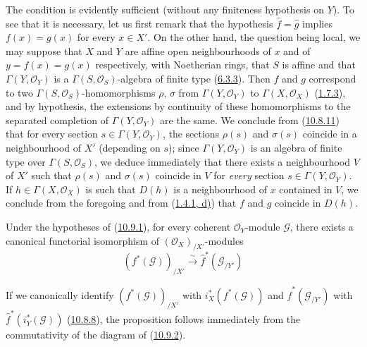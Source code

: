 The condition is evidently sufficient (without any finiteness hypothesis
on $Y$). To see that it is necessary, let us first remark that the
hypothesis $\widehat f=\widehat g$ implies $f(x)=g(x)$ for every
$x\in X'$. On the other hand, the question being local, we may suppose
that $X$ and $Y$ are affine open neighbourhoods of $x$ and of
$y=f(x)=g(x)$ respectively, with Noetherian rings, that $S$ is affine and
that $\Gamma(Y,\mathscr{O}_Y)$ is a $\Gamma(S,\mathscr{O}_S)$-algebra of
finite type (\hyperref[I.6.3.3]{6.3.3}). Then $f$ and $g$ correspond
to two $\Gamma(S,\mathscr{O}_S)$-homomorphisms $\rho$, $\sigma$ from
$\Gamma(Y,\mathscr{O}_Y)$ to $\Gamma(X,\mathscr{O}_X)$
(\hyperref[I.1.7.3]{1.7.3}), and by hypothesis, the extensions by
continuity of these homomorphisms to the separated completion of
$\Gamma(Y,\mathscr{O}_Y)$ are the same. We conclude from
(\hyperref[I.10.8.11]{10.8.11}) that for every section
$s\in\Gamma(Y,\mathscr{O}_Y)$, the sections $\rho(s)$ and $\sigma(s)$
coincide in a neighbourhood of $X'$ (depending on $s$); since
$\Gamma(Y,\mathscr{O}_Y)$ is an algebra of finite type over
$\Gamma(S,\mathscr{O}_S)$, we deduce immediately that there exists a
neighbourhood $V$ of $X'$ such that $\rho(s)$ and $\sigma(s)$ coincide in
$V$ for \emph{every} section $s\in\Gamma(Y,\mathscr{O}_Y)$. If
$h\in\Gamma(X,\mathscr{O}_X)$ is such that $D(h)$ is a neighbourhood of
$x$ contained in $V$, we conclude from the foregoing and from
(\hyperref[I.1.4.1]{1.4.1, d)}) that $f$ and $g$ coincide in $D(h)$.

\begin{proposition}[10.9.5]
\label{I.10.9.5}
Under the hypotheses of (\hyperref[I.10.9.1]{10.9.1}), for every
coherent $\mathscr{O}_Y$-module $\mathscr{G}$, there exists a canonical
functorial isomorphism of $(\mathscr{O}_X)_{/X'}$-modules
\[
  (f^*(\mathscr{G}))_{/X'}\xrightarrow{\sim}
  \widehat f^*(\mathscr{G}_{/Y'})
\]
\end{proposition}

If we canonically identify $(f^*(\mathscr{G}))_{/X'}$ with
$i_X^*(f^*(\mathscr{G}))$ and $\widehat f^*(\mathscr{G}_{/Y'})$ with
$\widehat f^*(i_Y^*(\mathscr{G}))$
(\hyperref[I.10.8.8]{10.8.8}), the proposition follows immediately
from the commutativity of the diagram of
(\hyperref[I.10.9.2]{10.9.2}).

